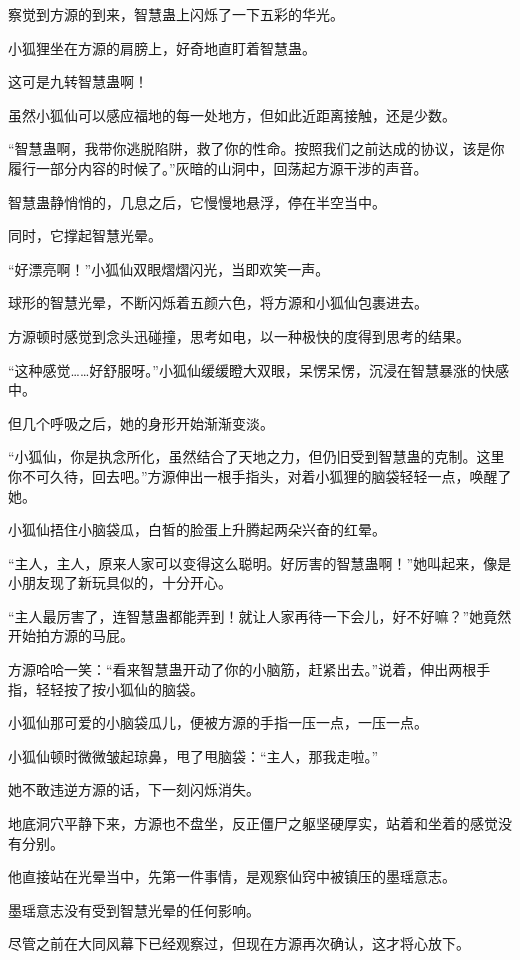 \begin{this_body}
察觉到方源的到来，智慧蛊上闪烁了一下五彩的华光。

小狐狸坐在方源的肩膀上，好奇地直盯着智慧蛊。

这可是九转智慧蛊啊！

虽然小狐仙可以感应福地的每一处地方，但如此近距离接触，还是少数。

“智慧蛊啊，我带你逃脱陷阱，救了你的性命。按照我们之前达成的协议，该是你履行一部分内容的时候了。”灰暗的山洞中，回荡起方源干涉的声音。

智慧蛊静悄悄的，几息之后，它慢慢地悬浮，停在半空当中。

同时，它撑起智慧光晕。

“好漂亮啊！”小狐仙双眼熠熠闪光，当即欢笑一声。

球形的智慧光晕，不断闪烁着五颜六色，将方源和小狐仙包裹进去。

方源顿时感觉到念头迅碰撞，思考如电，以一种极快的度得到思考的结果。

“这种感觉……好舒服呀。”小狐仙缓缓瞪大双眼，呆愣呆愣，沉浸在智慧暴涨的快感中。

但几个呼吸之后，她的身形开始渐渐变淡。

“小狐仙，你是执念所化，虽然结合了天地之力，但仍旧受到智慧蛊的克制。这里你不可久待，回去吧。”方源伸出一根手指头，对着小狐狸的脑袋轻轻一点，唤醒了她。

小狐仙捂住小脑袋瓜，白皙的脸蛋上升腾起两朵兴奋的红晕。

“主人，主人，原来人家可以变得这么聪明。好厉害的智慧蛊啊！”她叫起来，像是小朋友现了新玩具似的，十分开心。

“主人最厉害了，连智慧蛊都能弄到！就让人家再待一下会儿，好不好嘛？”她竟然开始拍方源的马屁。

方源哈哈一笑：“看来智慧蛊开动了你的小脑筋，赶紧出去。”说着，伸出两根手指，轻轻按了按小狐仙的脑袋。

小狐仙那可爱的小脑袋瓜儿，便被方源的手指一压一点，一压一点。

小狐仙顿时微微皱起琼鼻，甩了甩脑袋：“主人，那我走啦。”

她不敢违逆方源的话，下一刻闪烁消失。

地底洞穴平静下来，方源也不盘坐，反正僵尸之躯坚硬厚实，站着和坐着的感觉没有分别。

他直接站在光晕当中，先第一件事情，是观察仙窍中被镇压的墨瑶意志。

墨瑶意志没有受到智慧光晕的任何影响。

尽管之前在大同风幕下已经观察过，但现在方源再次确认，这才将心放下。


\end{this_body}
